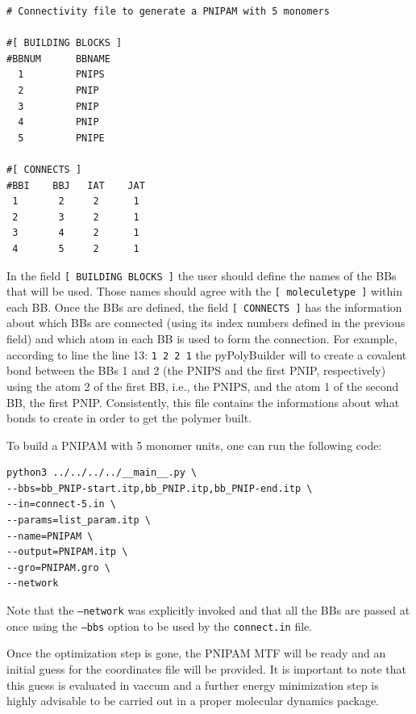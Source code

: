 \begin{lstlisting}
# Connectivity file to generate a PNIPAM with 5 monomers

#[ BUILDING BLOCKS ]
#BBNUM      BBNAME
  1     	PNIPS
  2     	PNIP
  3     	PNIP
  4	        PNIP
  5         PNIPE

#[ CONNECTS ]
#BBI    BBJ   IAT    JAT
 1       2     2      1
 2       3     2      1
 3       4     2      1
 4       5     2      1
\end{lstlisting}

In the field \texttt{[ BUILDING BLOCKS ]} the user should define the names of the BBs that will be used.
Those names should agree with the \texttt{[ moleculetype ]} within each BB.
Once the BBs are defined, the field \texttt{[ CONNECTS ]} has the information about which BBs are connected (using its index numbers defined in the previous field) and which atom in each BB is used to form the connection.
For example, according to line the line 13: \texttt{1       2     2      1} the pyPolyBuilder will to create a covalent bond between the BBs 1 and 2 (the PNIPS and the first PNIP, respectively) using the atom 2 of the first BB, i.e., the PNIPS, and the atom 1 of the second BB, the first PNIP.
Consistently, this file contains the informations about what bonds to create in order to get the polymer built.

To build a PNIPAM with 5 monomer units, one can run the following code:

\begin{lstlisting}
python3 ../../../../__main__.py \
--bbs=bb_PNIP-start.itp,bb_PNIP.itp,bb_PNIP-end.itp \
--in=connect-5.in \
--params=list_param.itp \
--name=PNIPAM \
--output=PNIPAM.itp \
--gro=PNIPAM.gro \
--network
\end{lstlisting}

Note that the \texttt{--network} was explicitly invoked and that all the BBs are passed at once using the \texttt{--bbs} option to be used by the \texttt{connect.in} file.

Once the optimization step is gone, the PNIPAM MTF will be ready and an initial guess for the coordinates file will be provided.
It is important to note that this guess is evaluated in vaccum and a further energy minimization step is highly advisable to be carried out in a proper molecular dynamics package.


